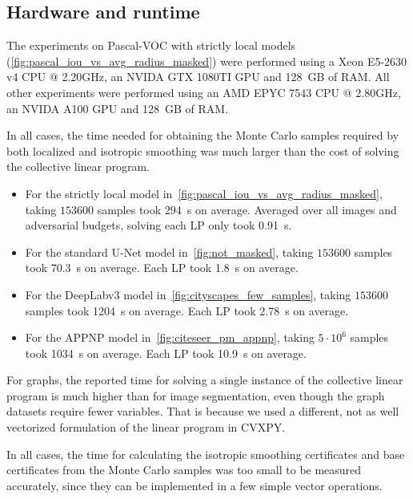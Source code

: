 \subsection{Hardware and runtime}
The experiments on Pascal-VOC with strictly local models (\autoref{fig:pascal_iou_vs_avg_radius_masked}) were performed using a Xeon E5-2630 v4 CPU @ 2.20GHz, an NVIDA GTX 1080TI GPU and \SI{128}{GB} of RAM.
All other experiments were performed using an AMD EPYC 7543 CPU @ 2.80GHz, an NVIDA A100 GPU and \SI{128}{GB} of RAM.

In all cases, the time needed for obtaining the Monte Carlo samples required by both localized and isotropic smoothing was much larger than the cost of solving the collective linear program.

\begin{itemize}
    \item For the strictly local model in~\cref{fig:pascal_iou_vs_avg_radius_masked}, taking $153600$ samples took \SI{294}{\second} on average. Averaged over all images and adversarial budgets, solving each LP only took \SI{0.91}{\second}.
    \item For the standard U-Net model in~\cref{fig:not_masked}, taking $153600$ samples took \SI{70.3}{\second} on average. Each LP took \SI{1.8}{\second} on average.
    \item For the DeepLabv3 model in~\cref{fig:cityscapes_few_samples}, taking $153600$ samples took \SI{1204}{\second} on average. Each LP took \SI{2.78}{\second} on average.
    \item For the APPNP model in~\cref{fig:citeseer_pm_appnp}, taking $5\cdot 10^6$ samples took \SI{1034}{\second} on average. Each LP took \SI{10.9}{\second} on average.
\end{itemize}
For graphs, the reported time for solving a single instance of the collective linear program is much higher than for image segmentation, even though the graph datasets require fewer variables. That is because we used a different, not as well vectorized formulation of the linear program in CVXPY.

In all cases, the time for calculating the isotropic smoothing certificates and base certificates from the Monte Carlo samples was too small to be measured accurately, since they can be implemented in a few simple vector operations.

\clearpage

